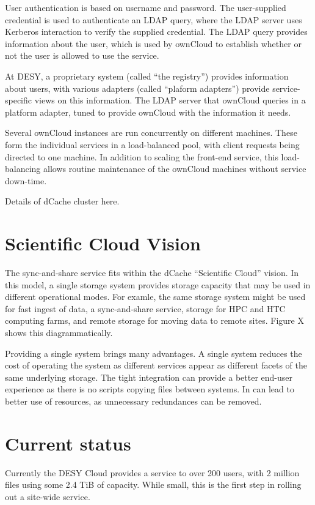 \documentclass[a4paper]{jpconf}
\begin{document}
User authentication is based on username and password.  The
user-supplied credential is used to authenticate an LDAP query, where
the LDAP server uses Kerberos interaction to verify the supplied
credential.  The LDAP query provides information about the user, which
is used by ownCloud to establish whether or not the user is allowed to
use the service.

At DESY, a proprietary system (called ``the registry'') provides
information about users, with various adapters (called ``plaform
adapters'') provide service-specific views on this information.  The
LDAP server that ownCloud queries in a platform adapter, tuned to
provide ownCloud with the information it needs.

Several ownCloud instances are run concurrently on different machines.
These form the individual services in a load-balanced pool, with
client requests being directed to one machine.  In addition to scaling
the front-end service, this load-balancing allows routine maintenance
of the ownCloud machines without service down-time.

Details of dCache cluster here.

\section{Scientific Cloud Vision}

The sync-and-share service fits within the dCache ``Scientific Cloud''
vision.  In this model, a single storage system provides storage
capacity that may be used in different operational modes.  For examle,
the same storage system might be used for fast ingest of data, a
sync-and-share service, storage for HPC and HTC computing farms, and
remote storage for moving data to remote sites.  Figure X shows this
diagrammatically.

Providing a single system brings many advantages.  A single system
reduces the cost of operating the system as different services appear
as different facets of the same underlying storage.  The tight
integration can provide a better end-user experience as there is no
scripts copying files between systems.  In can lead to better use of
resources, as unnecessary redundances can be removed.

\section{Current status}

Currently the DESY Cloud provides a service to over 200 users, with 2
million files using some 2.4 TiB of capacity.  While small, this is
the first step in rolling out a site-wide service.
\end{document}
